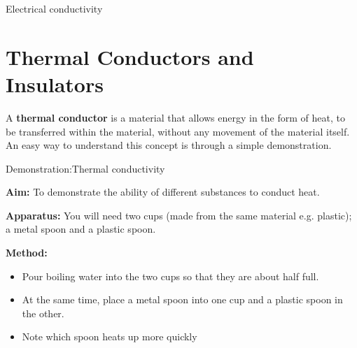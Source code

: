 \begin{iexperiment}{Electrical conductivity}
            \section{Thermal Conductors and Insulators}
            \nopagebreak
      \label{m38706*id66527}A \textbf{thermal conductor} is a material that allows energy in the form of heat, to be transferred within the material, without any movement of the material itself. An easy way to understand this concept is through a simple demonstration.\par 
\label{m38706*secfhsst!!!underscore!!!id453}
            \begin{gexperiment}{Demonstration:Thermal conductivity}{
            \nopagebreak
            \label{m38706*id66568}\noindent{}\textbf{Aim: }\newline
    To demonstrate the ability of different substances to conduct heat.\par 
      \label{m38706*id66588}\noindent{}\textbf{Apparatus: }\newline
    You will need two cups (made from the same material e.g. plastic); a metal spoon and a plastic spoon.\par 
	\begin{figure}[H] %
    \begin{center}
    \end{center}
 \end{figure} 
      \label{m38706*id66592}\noindent{}\textbf{Method: }
      \label{m38706*id66609}\begin{itemize}[noitemsep]
            \label{m38706*uid102}\item Pour boiling water into the two cups so that they are about half full.
\label{m38706*uid103}\item At the same time, place a metal spoon into one cup and a plastic spoon in the other.
\label{m38706*uid104}\item Note which spoon heats up more quickly

\end{itemize}}
\end{gexperiment}
\end{iexperiment}
